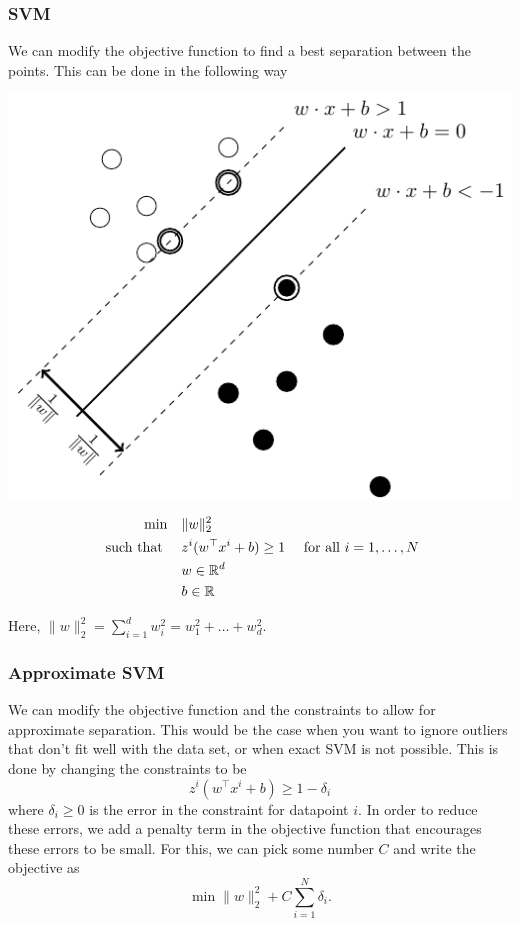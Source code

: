 \documentclass[../open-optimization/open-optimization.tex]{subfiles}
\begin{document}
\subsubsection{SVM}
We can modify the objective function to find a best separation between the points.  This can be done in the following way


\begin{center}
\includegraphics[scale = 0.75]{svm2}
\end{center}



\begin{align*}
\min \quad & \|w\|_2^2 \\
\text{ such that } \quad & z^i( w^\top x^i + b) \geq 1 & \text{ for all } i=1, \dots, N\\
& w  \in {\mathbb{R}}^d\\
& b \in {\mathbb{R}}
\end{align*}

Here, $\|w\|_2^2 = \sum_{i=1}^d w_i^2 = w_1^2 + \dots + w_d^2$.


\subsubsection{Approximate SVM}
We can modify the objective function and the constraints to allow for approximate separation.  This would be the case when you want to ignore outliers that don't fit well with the data set, or when exact SVM is not possible.  This is done by changing the constraints to be 
$$
z^i( w^\top x^i + b) \geq 1 - \delta_i
$$
where $\delta_i\geq 0$ is the error in the constraint for datapoint $i$.  In order to reduce these errors, we add a penalty term in the objective function that encourages these errors to be small.  For this, we can pick some number $C$ and write the objective as 
$$
\min  \|w\|_2^2  + C \sum_{i=1}^N \delta_i.
$$
\end{document}
